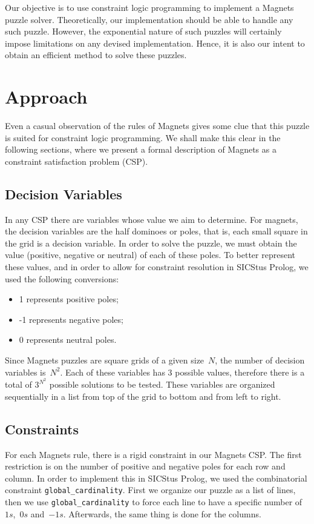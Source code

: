 \documentclass{llncs}
\begin{document}
Our objective is to use constraint logic programming to implement a Magnets puzzle solver. Theoretically, our implementation should be able to handle any such puzzle. However, the exponential nature of such puzzles will certainly impose limitations on any devised implementation. Hence, it is also our intent to obtain an efficient method to solve these puzzles.


\section{Approach}

Even a casual observation of the rules of Magnets gives some clue that this puzzle is suited for constraint logic programming. We shall make this clear in the following sections, where we present a formal description of Magnets as a constraint satisfaction problem (CSP).

\subsection{Decision Variables} 

In any CSP there are variables whose value we aim to determine. For magnets, the decision variables are the half dominoes or poles, that is, each small square in the grid is a decision variable. In order to solve the puzzle, we must obtain the value (positive, negative or neutral) of each of these poles. To better represent these values, and in order to allow for constraint resolution in SICStus Prolog, we used the following conversions:
\begin{itemize}
	\item 1 represents positive poles;
	\item -1 represents negative poles;
	\item 0 represents neutral poles. 
\end{itemize}

Since Magnets puzzles are square grids of a given size~$N$, the number of decision variables is~$N^2$. Each of these variables has 3 possible values, therefore there is a total of $3^{N^2}$ possible solutions to be tested. These variables are organized sequentially in a list from top of the grid to bottom and from left to right.

\subsection{Constraints} 

For each Magnets rule, there is a rigid constraint in our Magnets CSP. The first restriction is on the number of positive and negative poles for each row and column. In order to implement this in SICStus Prolog, we used the combinatorial constraint \verb|global_cardinality|. First we organize our puzzle as a list of lines, then we use \verb|global_cardinality| to force each line to have a specific number of~$1s$,~$0s$ and~$-1s$. Afterwards, the same thing is done for the columns.
\end{document}
